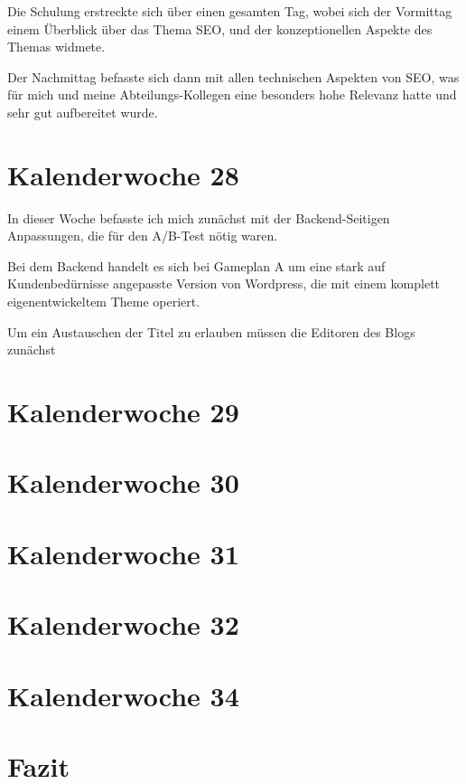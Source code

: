 \documentclass[11pt]{article} %
\begin{document}
Die Schulung erstreckte sich über einen gesamten Tag, wobei sich der Vormittag einem Überblick über das Thema SEO, und der konzeptionellen
Aspekte des Themas widmete. 

Der Nachmittag befasste sich dann mit allen technischen Aspekten von SEO, was für mich und meine Abteilungs-Kollegen eine besonders hohe Relevanz hatte und sehr gut aufbereitet wurde.

\section{Kalenderwoche 28} \label{sec:kw2}

In dieser Woche befasste ich mich zunächst mit der Backend-Seitigen Anpassungen, die für den A/B-Test nötig waren.

Bei dem Backend handelt es sich bei Gameplan A um eine stark auf Kundenbedürnisse angepasste Version von Wordpress, die mit einem komplett eigenentwickeltem Theme operiert.

Um ein Austauschen der Titel zu erlauben müssen die Editoren des Blogs zunächst 

\section{Kalenderwoche 29} \label{sec:kw2}
\section{Kalenderwoche 30} \label{sec:kw3}
\section{Kalenderwoche 31} \label{sec:kw3}
\section{Kalenderwoche 32} \label{sec:kw3}
\section{Kalenderwoche 34} \label{sec:kw3}
\section{Fazit} \label{sec:faz}

\newpage


\newpage
\end{document}
